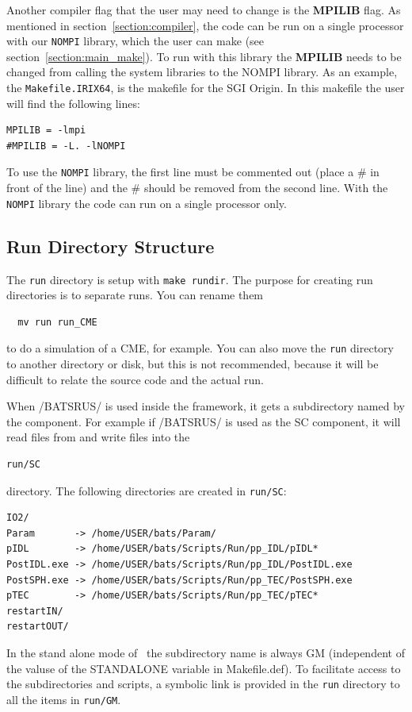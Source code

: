 Another compiler flag that the user may need to change is the {\bf MPILIB}
flag.  As mentioned in section~\ref{section:compiler}, the code can be
run on a single processor with our {\tt NOMPI} library, which the user
can make (see section~\ref{section:main_make}).  To run with this library the
{\bf MPILIB} needs to be changed from calling the system libraries to 
the NOMPI library.  As an example, the {\tt Makefile.IRIX64}, is the makefile
for the SGI Origin.  In this makefile the user will find the following lines:
\begin{verbatim}
MPILIB = -lmpi
#MPILIB = -L. -lNOMPI
\end{verbatim}
To use the {\tt NOMPI} library, the first line must be commented out (place a 
\# in front of the line) and the \# should be removed from the second line.
With the {\tt NOMPI} library the code can run on a single processor only.

\subsection{Run Directory Structure \label{section:run_dir}}

The {\tt run} directory is setup with {\tt make rundir}.
The purpose for creating run directories is to separate runs.  
You can rename them
\begin{verbatim}
  mv run run_CME
\end{verbatim}
to do a simulation of a CME, for example.  
You can also move the {\tt run} directory to another
directory or disk, but this is not recommended,
because it will be difficult to relate the source code
and the actual run.

When /BATSRUS/ is used inside the framework, it gets a
subdirectory named by the component. For example
if /BATSRUS/ is used as the SC component, it 
will read files from and write files into the
\begin{verbatim}
run/SC
\end{verbatim}
directory. The following directories are created in {\tt run/SC}:
\begin{verbatim}
IO2/
Param       -> /home/USER/bats/Param/
pIDL        -> /home/USER/bats/Scripts/Run/pp_IDL/pIDL*
PostIDL.exe -> /home/USER/bats/Scripts/Run/pp_IDL/PostIDL.exe
PostSPH.exe -> /home/USER/bats/Scripts/Run/pp_TEC/PostSPH.exe
pTEC        -> /home/USER/bats/Scripts/Run/pp_TEC/pTEC*
restartIN/
restartOUT/
\end{verbatim}
In the stand alone mode of \BATSRUS\ the subdirectory name
is always GM (independent of the valuse of the STANDALONE variable
in Makefile.def). To facilitate access to the subdirectories and
scripts, a symbolic link is provided
in the {\tt run} directory to all the items in {\tt run/GM}.

